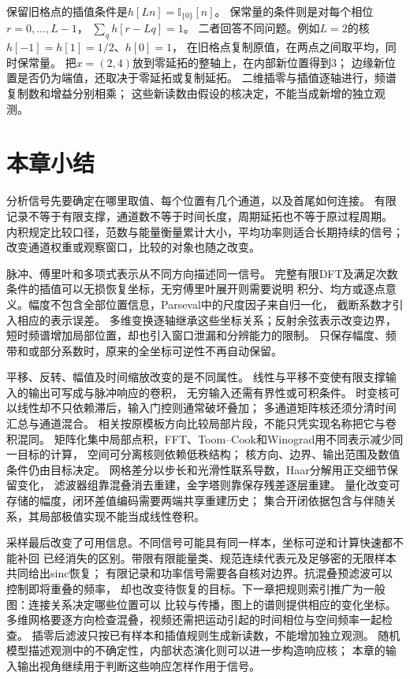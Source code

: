 保留旧格点的插值条件是$h[Ln]=\mathbb I_{\{0\}}[n]$。
保常量的条件则是对每个相位$r=0,\ldots,L-1$，
$\sum_qh[r-Lq]=1$。
二者回答不同问题。例如$L=2$的核$h[-1]=h[1]=1/2$、$h[0]=1$，
在旧格点复制原值，在两点之间取平均，同时保常量。
把$x=(2,4)$放到零延拓的整轴上，在内部新位置得到$3$；
边缘新位置是否仍为端值，还取决于零延拓或复制延拓。
二维插零与插值逐轴进行，频谱复制数和增益分别相乘；
这些新读数由假设的核决定，不能当成新增的独立观测。

\section{本章小结}
\label{sec:signal-analysis-summary}

分析信号先要确定在哪里取值、每个位置有几个通道，以及首尾如何连接。
有限记录不等于有限支撑，通道数不等于时间长度，周期延拓也不等于原过程周期。
内积规定比较口径，范数与能量衡量累计大小，平均功率则适合长期持续的信号；
改变通道权重或观察窗口，比较的对象也随之改变。

脉冲、傅里叶和多项式表示从不同方向描述同一信号。
完整有限DFT及满足次数条件的插值可以无损恢复坐标，无穷傅里叶展开则需要说明
积分、均方或逐点意义。幅度不包含全部位置信息，Parseval中的尺度因子来自归一化，
截断系数才引入相应的表示误差。
多维变换逐轴继承这些坐标关系；反射余弦表示改变边界，
短时频谱增加局部位置，却也引入窗口泄漏和分辨能力的限制。
只保存幅度、频带和或部分系数时，原来的全坐标可逆性不再自动保留。

平移、反转、幅值及时间缩放改变的是不同属性。
线性与平移不变使有限支撑输入的输出可写成与脉冲响应的卷积，
无穷输入还需有界性或可积条件。
时变核可以线性却不只依赖滞后，输入门控则通常破坏叠加；
多通道矩阵核还须分清时间汇总与通道混合。
相关按原模板方向比较局部片段，不能只凭实现名称把它与卷积混同。
矩阵化集中局部点积，FFT、Toom--Cook和Winograd用不同表示减少同一目标的计算，
空间可分离核则依赖低秩结构；
核方向、边界、输出范围及数值条件仍由目标决定。
网格差分以步长和光滑性联系导数，Haar分解用正交细节保留变化，
滤波器组靠混叠消去重建，金字塔则靠保存残差逐层重建。
量化改变可存储的幅度，闭环差值编码需要两端共享重建历史；
集合开闭依据包含与伴随关系，其局部极值实现不能当成线性卷积。

采样最后改变了可用信息。不同信号可能具有同一样本，坐标可逆和计算快速都不能补回
已经消失的区别。带限有限能量类、规范连续代表元及足够密的无限样本共同给出sinc恢复；
有限记录和功率信号需要各自核对边界。抗混叠预滤波可以控制即将重叠的频率，
却也改变待恢复的目标。下一章把规则索引推广为一般图：连接关系决定哪些位置可以
比较与传播，图上的谱则提供相应的变化坐标。
多维网格要逐方向检查混叠，视频还需把运动引起的时间相位与空间频率一起检查。
插零后滤波只按已有样本和插值规则生成新读数，不能增加独立观测。
随机模型描述观测中的不确定性，内部状态演化则可以进一步构造响应核；
本章的输入输出视角继续用于判断这些响应怎样作用于信号。
